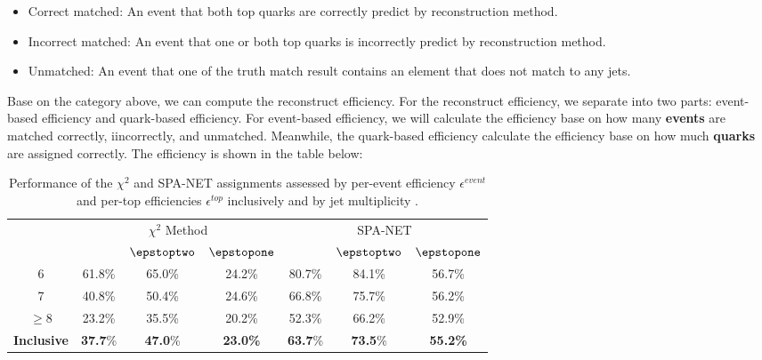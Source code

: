 \begin{itemize}
	\item Correct matched: An event that both top quarks are correctly predict by reconstruction method.
	\item Incorrect matched: An event that one or both top quarks is incorrectly predict by reconstruction method.
	\item Unmatched: An event that one of the truth match result contains an element that does not match to any jets.
\end{itemize}
Base on the category  above, we can compute the reconstruct efficiency. For the reconstruct efficiency, we separate into two parts: event-based efficiency and quark-based efficiency. For event-based efficiency, we will calculate the efficiency base on how many \textbf{events} are matched correctly, iincorrectly, and unmatched. Meanwhile, the quark-based efficiency calculate the efficiency base on how much \textbf{quarks} are assigned correctly. The efficiency is shown in the table below:
\begin{table}[H]
	\caption{ Performance of the $\chi^2$ and SPA-NET assignments assessed by per-event efficiency $\epsilon^{event}$ and per-top efficiencies $\epsilon^{top}$ inclusively and by jet multiplicity \Njets. %
	}
	\centering
	\begin{tabular}{c c  c  c  c c  c}
		\hline
		\hline
		& \multicolumn{3}{c}{$\chi^2$ Method} & \multicolumn{3}{c}{SPA-NET }\\
		\hspace{0.2cm}\Njets & \hspace{0.15cm} \epsevent & $\epstoptwo$ & \hspace{0.15cm} $\epstopone$ \hspace{0.15cm} & \hspace{0.15cm} \epsevent & $\epstoptwo$ & \hspace{0.15cm} $\epstopone$ \hspace{0.15cm}   \\
		\midrule
		6          & 61.8\% & 65.0\% & 24.2\% & 80.7\% & 84.1\% & 56.7\% \\
		7          & 40.8\% & 50.4\% & 24.6\% & 66.8\% & 75.7\% & 56.2\% \\
		$\geq$8    & 23.2\% & 35.5\% & 20.2\% & 52.3\% & 66.2\% & 52.9\% \\
		\midrule     
		\vspace{0.2cm}
		\textbf{Inclusive}  &\textbf{ 37.7}\% & \textbf{47.0}\% & \textbf{23.0\%} & \textbf{63.7}\% &\textbf{73.5}\% &\textbf{55.2\%} \\
		\hline
	\end{tabular}
	
	\label{tab:eps}
\end{table}
